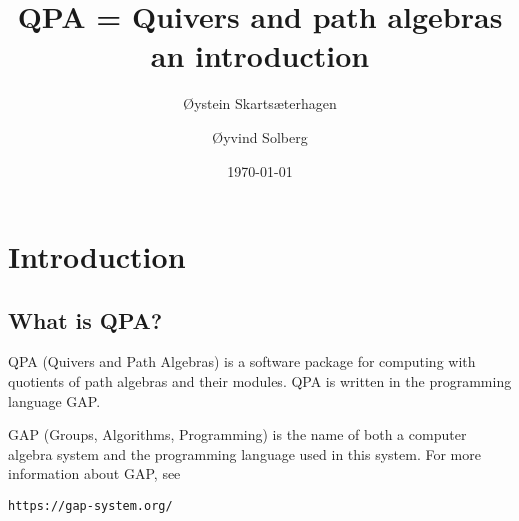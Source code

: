\documentclass{amsart}
\theoremstyle{definition}
\theoremstyle{theoretic}
\begin{document}
\title[QPA -- an introduction]{QPA = Quivers and path algebras\\an introduction} 

\author[Skarts\ae terhagen]{\O ystein  Skarts\ae terhagen}
\address{\O ystein Skarts\ae terhagen\\
Institutt for matematiske fag\\
NTNU\\ 
N--7491 Trondheim\\ 
Norway}

\author[Solberg]{\O yvind Solberg}
\address{\O yvind Solberg\\
Institutt for matematiske fag\\
NTNU\\ 
N--7491 Trondheim\\ 
Norway}

\date{\today}


\maketitle


\enlargethispage{\baselineskip} %
\section{Introduction}

\subsection{What is QPA?\nopunct}

QPA (Quivers and Path Algebras) is a software package for computing
with quotients of path algebras and their modules.  QPA is written in
the programming language GAP.

GAP (Groups, Algorithms, Programming) is the name of both a computer
algebra system and the programming language used in this system.  For
more information about GAP, see
\begin{center}
\texttt{https://gap-system.org/}
\end{center}
\end{document}
